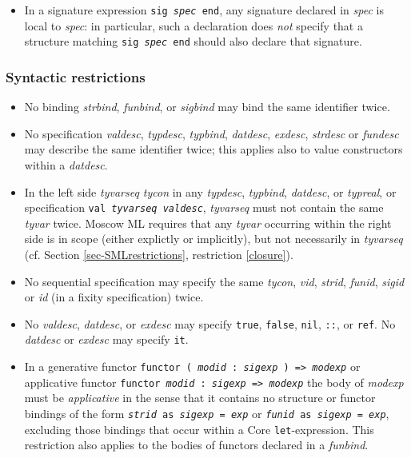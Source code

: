\documentclass[fleqn,a4paper]{article}
\begin{document}
\begin{itemize}
\item In a signature expression {\tt sig {\it spec\/} end}, any
signature declared in {\it spec\/} is local to {\it spec\/}: in particular,
such a declaration does \emph{not}
specify that a structure matching {\tt sig {\it spec\/} end} should
also declare that signature.
\end{itemize}

\subsubsection*{Syntactic restrictions}

\begin{itemize}
\item No binding {\it strbind\/}, {\it funbind\/}, or {\it sigbind \/} may bind
      the same identifier twice.

\item No specification {\it valdesc\/}, {\it typdesc\/}, {\it
    typbind\/}, {\it datdesc\/}, {\it exdesc\/}, {\it strdesc} or {\it fundesc} may describe the same identifier twice; this applies also to value constructors
  within a {\it datdesc\/}.

\item In the left side {\it tyvarseq tycon\/} in any {\it typdesc\/},
  {\it typbind\/}, {\it datdesc\/}, or {\it typreal},
  or specification {\tt val {\it tyvarseq valdesc}}, {\it tyvarseq\/} must not
  contain the same {\it tyvar\/} twice. 
  Moscow ML
  requires that   any {\it tyvar\/} occurring within the right side
  is in scope (either explictly or implicitly), but not necessarily in
  {\it tyvarseq} (cf. Section \ref{sec-SMLrestrictions}, restriction \ref{closure}).

 
\item No sequential specification 
  may specify the same {\it tycon}, {\it vid}, {\it strid}, {\it funid}, {\it  sigid} or {\it id} (in a fixity specification) twice.
  
\item No {\it valdesc}, {\it datdesc}, or {\it exdesc} may specify
  {\tt true}, {\tt false}, {\tt nil}, {\tt ::}, or {\tt ref}.  No {\it
    datdesc\/} or {\it exdesc} may specify {\tt it}.

\item In a generative functor {\tt functor ( {\it modid\/} :\ {\it sigexp} ) => {\it modexp}}
or applicative functor {\tt functor {\it modid\/} :\ {\it sigexp\/} => {\it modexp}}
the body of {\it modexp} must be {\it applicative} in the sense that it contains
no structure or functor bindings of the form 
{\tt {\it strid\/} as {\it sigexp} = {\it exp}} or
{\tt {\it funid\/} as {\it sigexp} = {\it exp}},
excluding those bindings that occur within a Core {\tt let}-expression.
This restriction also applies to the bodies of functors declared in a {\it funbind}.



\end{itemize}
\end{document}
